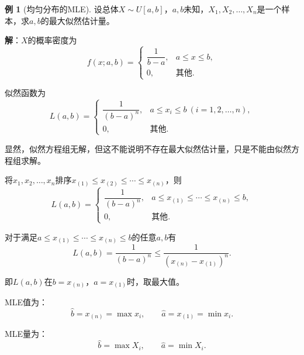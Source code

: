 \documentclass[11pt,a4paper]{report}
\theoremstyle{definition}
\newtheorem{example}{例}[chapter]
\begin{document}
\begin{example}[均匀分布的MLE]
设总体$X\sim U[a,b]$，$a,b$未知，$X_{1},X_{2},\ldots,X_{n}$是一个样本，求$a,b$的最大似然估计量。

\textbf{解}：$X$的概率密度为
\[
f(x;a,b)=
\begin{cases}
\dfrac{1}{b-a}, & a\leq x\leq b,\\[0.5em]
0, & \text{其他}.
\end{cases}
\]

似然函数为
\[
L(a,b)=
\begin{cases}
\dfrac{1}{(b-a)^{n}}, & a\leq x_{i}\leq b\ (i=1,2,\ldots,n),\\[0.5em]
0, & \text{其他}.
\end{cases}
\]

显然，似然方程组无解，但这不能说明不存在最大似然估计量，只是不能由似然方程组求解。

将$x_{1},x_{2},\ldots,x_{n}$排序$x_{(1)}\leq x_{(2)}\leq\cdots\leq x_{(n)}$，则
\[
L(a,b)=
\begin{cases}
\dfrac{1}{(b-a)^{n}}, & a\leq x_{(1)}\leq\cdots\leq x_{(n)}\leq b,\\[0.5em]
0, & \text{其他}.
\end{cases}
\]

对于满足$a\leq x_{(1)}\leq\cdots\leq x_{(n)}\leq b$的任意$a,b$有
\[
L(a,b)=\frac{1}{(b-a)^{n}}\leq\frac{1}{\left(x_{(n)}-x_{(1)}\right)^{n}}.
\]

即$L(a,b)$在$b=x_{(n)}$，$a=x_{(1)}$时，取最大值。

MLE值为：
\[
\hat{b}=x_{(n)}=\max x_{i},\qquad \hat{a}=x_{(1)}=\min x_{i}.
\]

MLE量为：
\[
\hat{b}=\max X_{i},\qquad \hat{a}=\min X_{i}.
\]
\end{example}
\end{document}
